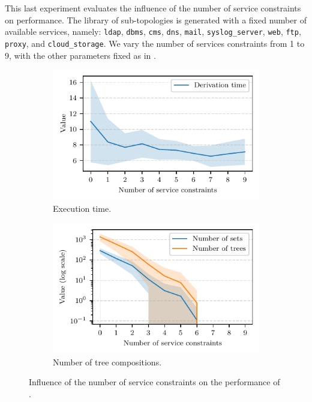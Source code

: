 This last experiment evaluates the influence of the number of service constraints on performance.
The library of sub-topologies is generated with a fixed number of available services, namely: \texttt{ldap}, \texttt{dbms}, \texttt{cms}, \texttt{dns}, \texttt{mail}, \verb|syslog_server|, \texttt{web}, \texttt{ftp}, \texttt{proxy}, and \verb|cloud_storage|.
We vary the number of services constraints from 1 to 9, with the other parameters fixed as in .

\begin{figure}
  \centering
  \begin{subfigure}{0.49\linewidth}
    \includegraphics[width=\linewidth]{figures/services_time.pdf}
    \caption{
      Execution time.
      \label{fig:topologies.benchmark.services.time}
    }
  \end{subfigure}
  \hfill
  \begin{subfigure}{0.49\linewidth}
    \includegraphics[width=\linewidth]{figures/services_numbers.pdf}
    \caption{
      Number of tree compositions.
      \label{fig:topologies.benchmark.services.numbers}
    }
  \end{subfigure}
  \caption{
    Influence of the number of service constraints on the performance of \thecontrib.
    \label{fig:topologies.benchmark.services}
  }
\end{figure}

